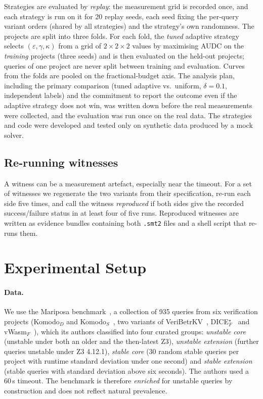 \documentclass[11pt]{article}
\begin{document}
Strategies are evaluated by \emph{replay}: the measurement grid is recorded once, and each strategy is run on it for 20 replay seeds, each seed fixing the per-query variant orders (shared by all strategies) and the strategy's own randomness. The projects are split into three folds. For each fold, the \emph{tuned} adaptive strategy selects $(\varepsilon,\gamma,\kappa)$ from a grid of $2\times2\times2$ values by maximising AUDC on the \emph{training} projects (three seeds) and is then evaluated on the held-out projects; queries of one project are never split between training and evaluation. Curves from the folds are pooled on the fractional-budget axis. The analysis plan, including the primary comparison (tuned adaptive vs.\ uniform, $\delta=0.1$, independent labels) and the commitment to report the outcome even if the adaptive strategy does not win, was written down before the real measurements were collected, and the evaluation was run once on the real data. The strategies and code were developed and tested only on synthetic data produced by a mock solver.

\subsection{Re-running witnesses}
\label{sec:confirm}

A witness can be a measurement artefact, especially near the timeout. For a set of witnesses we regenerate the two variants from their specification, re-run each side five times, and call the witness \emph{reproduced} if both sides give the recorded success/failure status in at least four of five runs. Reproduced witnesses are written as evidence bundles containing both \texttt{.smt2} files and a shell script that re-runs them.

\section{Experimental Setup}
\label{sec:setup}

\paragraph{Data.} We use the Mariposa benchmark~\cite{mariposa}, a collection of 935 queries from six verification projects (Komodo$_D$ and Komodo$_S$~\cite{komodo}, two variants of VeriBetrKV~\cite{veribetrkv}, DICE$^\star_F$~\cite{dice} and vWasm$_F$~\cite{vwasm}), which its authors classified into four curated groups: \emph{unstable core} (unstable under both an older and the then-latest Z3), \emph{unstable extension} (further queries unstable under Z3 4.12.1), \emph{stable core} (30 random stable queries per project with runtime standard deviation under one second) and \emph{stable extension} (stable queries with standard deviation above six seconds). The authors used a 60\,s timeout. The benchmark is therefore \emph{enriched} for unstable queries by construction and does not reflect natural prevalence.
\end{document}
